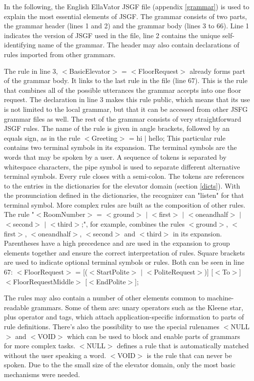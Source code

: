 \documentclass[a4paper, 12pt]{article}
\begin{document}
In the following, the English EllaVator JSGF file (appendix \ref{grammar}) is used to explain the most essential elements of JSGF.
The grammar consists of two parts, the grammar header (lines 1 and 2) and the grammar body (lines 3 to 66).
Line 1 indicates the version of JSGF used in the file, line 2 contains the unique self-identifying name of the grammar.
The header may also contain declarations of rules imported from other grammars.


The rule in line 3, $<$BasicElevator$>$ = $<$FloorRequest$>$ already forms part of the grammar body.
It links to the last rule in the file (line 67).
This is the rule that combines all of the possible utterances the grammar accepts into one floor request.
The declaration in line 3 makes this rule public, which means that its use is not limited to the local grammar, but that it can be accessed from other JSFG grammar files as well.
The rest of the grammar consists of very straightforward JSGF rules.
The name of the rule is given in angle brackets, followed by an equals sign, as in the rule $<$Greeting$>$ = hi $|$ hello;
This particular rule contains two terminal symbols in its expansion.
The terminal symbols are the words that may be spoken by a user.
A sequence of tokens is separated by whitespace characters, the pipe symbol is used to separate different alternative terminal symbols.
Every rule closes with a semi-colon.
The tokens are references to the entries in the dictionaries for the elevator domain (section \ref{dicts}).
With the pronunciation defined in the dictionaries, the recognizer can "listen" for that terminal symbol.
More complex rules are built as the composition of other rules.
The rule "$<$RoomNumber$>$ = $<$ground$>$ $|$ $<$first$>$ $|$ $<$oneandhalf$>$ $|$ $<$second$>$ $|$ $<$third$>$;", for example, combines the rules $<$ground$>$, $<$first$>$, $<$oneandhalf$>$, $<$second$>$ and  $<$third$>$ in its expansion.
 Parentheses have a high precedence and  are used in the expansion to group elements together and ensure the correct interpretation of rules.
Square brackets are used to indicate optional terminal symbols or rules.
Both can be seen in line 67: $<$FloorRequest$>$ =  [($<$StartPolite$>$ $|$ $<$PoliteRequest$>$)]  [$<$To$>$] $<$FloorRequestMiddle$>$ [$<$EndPolite$>$];


The rules may also contain a number of other elements common to machine-readable grammars.
Some of them are: unary operators such as the Kleene star, plus operator and tags, which attach application-specific information to parts of rule definitions.
There's also the possibility to use the special rulenames $<$NULL$>$ and $<$VOID$>$ which can be used to block and enable parts of grammars for more complex tasks.
$<$NULL$>$ defines a rule that is automatically matched without the user speaking a word.
$<$VOID$>$ is the rule that can never be spoken.
Due to the the small size of the elevator domain, only the most basic mechanisms were needed.
\end{document}
